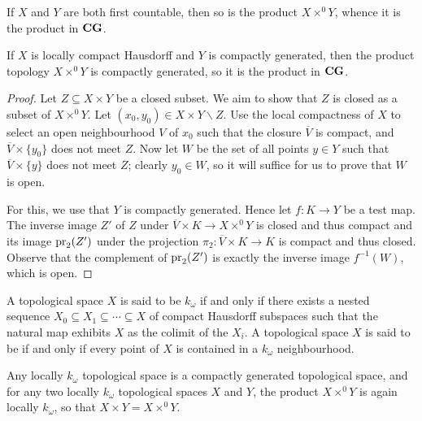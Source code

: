 \begin{exm}
	If $ X $ and $ Y $ are both first countable, then so is the product $ X \times^0 Y $, whence it is the product in $ \textbf{\textup{CG}} $.
\end{exm}

\begin{prp}
	If $ X $ is locally compact Hausdorff and $ Y $ is compactly generated, then the product topology $ X \times^0 Y $ is compactly generated, so it is the product in $ \textbf{\textup{CG}} $.
\end{prp}

\begin{proof}
	Let $ Z \subseteq X \times Y $ be a closed subset.
	We aim to show that $ Z $ is closed as a subset of $ X \times^0 Y $.
	Let $ (x_0, y_0) \in  X \times Y \smallsetminus Z $.
	Use the local compactness of $ X $ to select an open neighbourhood $ V $ of $ x_0 $ such that the closure $ \overline{ V } $ is compact, and $ \overline{ V } \times \{ y_0 \} $ does not meet $ Z $.
	Now let $ W $ be the set of all points $ y \in Y $ such that $ \overline{V} \times \{ y \} $ does not meet $ Z $;
	clearly $ y_0 \in W $, so it will suffice for us to prove that $ W $ is open.

	For this, we use that $ Y $ is compactly generated.
	Hence let $ f \colon K \to Y $ be a test map.
	The inverse image $ Z' $ of $ Z $ under $ \overline{ V } \times K \to X \times^0 Y $ is closed and thus compact and its image $ \operatorname{pr}_2(Z') $ under the projection $ \pi_2 \colon \overline{ V } \times K \to K $ is compact and thus closed.
	Observe that the complement of $ \operatorname{pr}_2(Z') $ is exactly the inverse image $ f^{-1}(W) $, which is open.
\end{proof}

\begin{dfn}
	A topological space $ X $ is said to be $ k_{\omega} $ if and only if there exists a nested sequence $ X_0 \subseteq X_1 \subseteq \cdots \subseteq X $ of compact Hausdorff subspaces such that the natural map exhibits $ X $ as the colimit of the $ X_i $.
	A topological space $ X $ is said to be  if and only if every point of $ X $ is contained in a $ k_{\omega} $ neighbourhood.
\end{dfn}

\begin{prp}
	Any locally $ k_{\omega} $ topological space is a compactly generated topological space, and for any two locally $ k_{\omega} $ topological spaces $ X $ and $ Y $, the product $ X \times^0 Y $ is again locally $ k_{\omega} $, so that $ X \times Y = X \times^0 Y $.
\end{prp}

